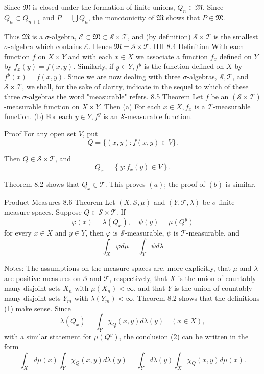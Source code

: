 Since $\mathfrak{M}$ is closed under the formation of finite unions, $Q_n \in \mathfrak{M}$.
Since $Q_n \subset Q_{n+1}$ and $P=\bigcup Q_n$, the monotonicity of $\mathfrak{M}$ shows that $P \in \mathfrak{M}$.

Thus $\mathfrak{M}$ is a $\sigma$-algebra, $\mathscr{E} \subset \mathfrak{M} \subset \mathscr{S} \times \mathscr{T}$, and (by definition) $\mathscr{S} \times \mathscr{T}$ is the smallest $\sigma$-algebra which contains $\mathscr{E}$. Hence $\mathfrak{M}=\mathscr{S} \times \mathscr{T}$.
IIII
8.4 Definition With each function $f$ on $X \times Y$ and with each $x \in X$ we associate a function $f_x$ defined on $Y$ by $f_x(y)=f(x, y)$.
Similarly, if $y \in Y, f^y$ is the function defined on $X$ by $f^y(x)=f(x, y)$.
Since we are now dealing with three $\sigma$-algebras, $\mathscr{S}, \mathscr{T}$, and $\mathscr{S} \times \mathscr{T}$, we shall, for the sake of clarity, indicate in the sequel to which of these three $\sigma$-algebras the word "measurable" refers.
8.5 Theorem Let $f$ be an $(\mathscr{S} \times \mathscr{T})$-measurable function on $X \times Y$. Then
(a) For each $x \in X, f_x$ is a $\mathscr{T}$-measurable function.
(b) For each $y \in Y, f^y$ is an $\mathscr{S}$-measurable function.

Proof For any open set $V$, put
$$
Q=\{(x, y): f(x, y) \in V\} .
$$

Then $Q \in \mathscr{S} \times \mathscr{T}$, and
$$
Q_x=\left\{y: f_x(y) \in V\right\} .
$$

Theorem 8.2 shows that $Q_x \in \mathscr{T}$. This proves $(a)$; the proof of $(b)$ is similar.

Product Measures
8.6 Theorem Let $(X, \mathscr{S}, \mu)$ and $(Y, \mathscr{T}, \lambda)$ be $\sigma$-finite measure spaces. Suppose $Q \in \mathscr{S} \times \mathscr{T}$. If
$$
\varphi(x)=\lambda\left(Q_x\right), \quad \psi(y)=\mu\left(Q^y\right)
$$
for every $x \in X$ and $y \in Y$, then $\varphi$ is $\mathscr{S}$-measurable, $\psi$ is $\mathscr{T}$-measurable, and
$$
\int_X \varphi d \mu=\int_Y \psi d \lambda
$$

Notes: The assumptions on the measure spaces are, more explicitly, that $\mu$ and $\lambda$ are positive measures on $\mathscr{S}$ and $\mathscr{T}$, respectively, that $X$ is the union of countably many disjoint sets $X_n$ with $\mu\left(X_n\right)<\infty$, and that $Y$ is the union of countably many disjoint sets $Y_m$ with $\lambda\left(Y_m\right)<\infty$.
Theorem 8.2 shows that the definitions (1) make sense. Since
$$
\lambda\left(Q_x\right)=\int_Y \chi_Q(x, y) d \lambda(y) \quad(x \in X),
$$
with a similar statement for $\mu\left(Q^y\right)$, the conclusion (2) can be written in the form
$$
\int_X d \mu(x) \int_Y \chi_Q(x, y) d \lambda(y)=\int_Y d \lambda(y) \int_X \chi_Q(x, y) d \mu(x) .
$$

